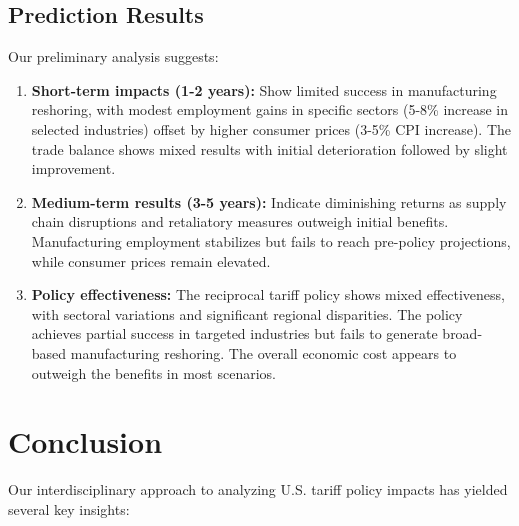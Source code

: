 \documentclass[12pt]{article}
\begin{document}
\subsection{Prediction Results}
Our preliminary analysis suggests:
\begin{enumerate}
    \item \textbf{Short-term impacts (1-2 years):} Show limited success in manufacturing reshoring, with modest employment gains in specific sectors (5-8\% increase in selected industries) offset by higher consumer prices (3-5\% CPI increase). The trade balance shows mixed results with initial deterioration followed by slight improvement.
    
    \item \textbf{Medium-term results (3-5 years):} Indicate diminishing returns as supply chain disruptions and retaliatory measures outweigh initial benefits. Manufacturing employment stabilizes but fails to reach pre-policy projections, while consumer prices remain elevated.
    
    \item \textbf{Policy effectiveness:} The reciprocal tariff policy shows mixed effectiveness, with sectoral variations and significant regional disparities. The policy achieves partial success in targeted industries but fails to generate broad-based manufacturing reshoring. The overall economic cost appears to outweigh the benefits in most scenarios.
\end{enumerate}

\section{Conclusion}

Our interdisciplinary approach to analyzing U.S. tariff policy impacts has yielded several key insights:
\end{document}
